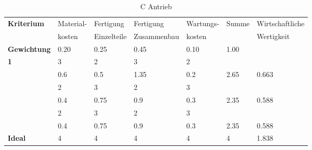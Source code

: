 \documentclass[10pt,a4paper]{article}
\begin{document}
\begin{table}[h!]
    \centering
    \hspace*{0in}
    \begin{tabular}{>{\bfseries}p{2cm} p{2.2cm} p{2cm} p{2cm} p{2.5cm} p{2cm} p{2cm}}
        \toprule
        Kriterium  & Material- & Fertigung   & Fertigung   & Wartungs- & Summe & Wirtschaftliche \\
                   & kosten    & Einzelteile & Zusammenbau & kosten    &       & Wertigkeit      \\
        \midrule
        Gewichtung & 0.20      & 0.25        & 0.45        & 0.10      & 1.00  &                 \\
        \midrule
        1          & 3         & 2           & 3           & 2         &       &                 \\
                   & 0.6       & 0.5         & 1.35        & 0.2       & 2.65  & 0.663           \\
        \addlinespace
        2          & 2         & 3           & 2           & 3         &       &                 \\
                   & 0.4       & 0.75        & 0.9         & 0.3       & 2.35  & 0.588           \\
        \addlinespace
        3          & 2         & 3           & 2           & 3         &       &                 \\
                   & 0.4       & 0.75        & 0.9         & 0.3       & 2.35  & 0.588           \\
        \addlinespace
        Ideal      & 4         & 4           & 4           & 4         & 4     & 1.838           \\
        \bottomrule
    \end{tabular}
    \caption{C Antrieb}
    \label{tab:antrieb}
\end{table}
\end{document}
